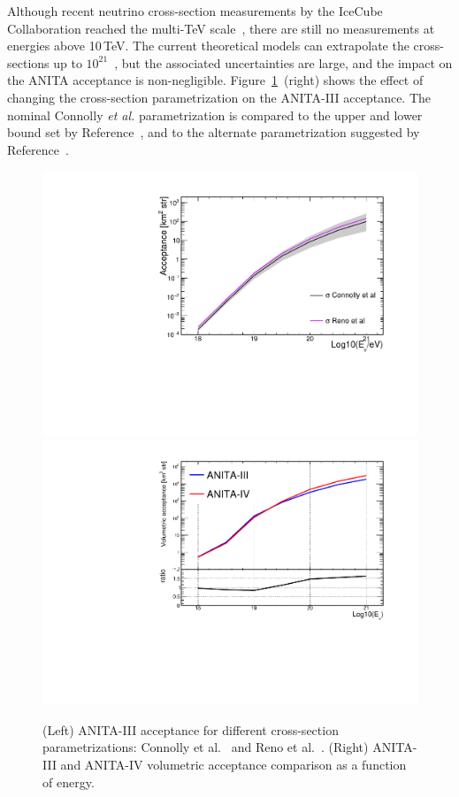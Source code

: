 Although recent neutrino cross-section measurements by the IceCube
Collaboration reached the multi-TeV
scale~\cite{aartsen2017measurement,bustamante2017measurement}, there
are still no measurements at energies above 10\,TeV.
The current theoretical models can extrapolate the cross-sections up to $10^{21}$\ev~\cite{PhysRevD.83.113009,reno2005high},
but the associated uncertainties are
large, and the impact on the ANITA acceptance is
non-negligible.
Figure~\ref{fig:acceptanceVSxsec}~(right) shows the effect of changing the
cross-section parametrization on the ANITA-III acceptance.
The nominal Connolly {\it et al.} parametrization is compared to the upper and lower bound set by
Reference~\cite{PhysRevD.83.113009}, and to the alternate
parametrization suggested by Reference~\cite{reno2005high}.


\begin{figure}[!h]\centering
  \includegraphics[width=.45\linewidth]{./Figs/AcceptanceVScrossSectionParam_ANITA3.pdf}
  \includegraphics[width=.45\linewidth]{./Figs/CompareEffVol_A3vsA4.pdf}
  \caption{(Left) ANITA-III acceptance for different cross-section parametrizations: Connolly et al.~\cite{PhysRevD.83.113009} and Reno et al.~\cite{reno2005high}. (Right) ANITA-III and ANITA-IV volumetric acceptance comparison as a function of energy.}
  \label{fig:acceptanceVSxsec}
\end{figure}



